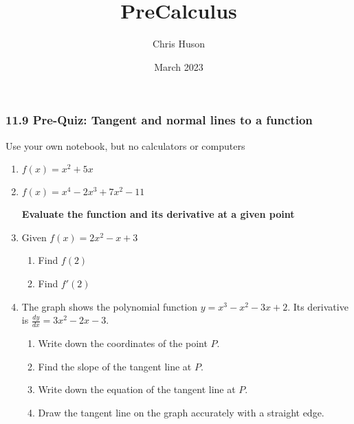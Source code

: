 \documentclass[12pt, twoside]{article}
\title{PreCalculus}
\author{Chris Huson}
\date{March 2023}
\begin{document}
\subsubsection*{11.9 Pre-Quiz: Tangent and normal lines to a function}
Use your own notebook, but no calculators or computers

\begin{enumerate}

\subsubsection*{Find the derivative of each polynomial function}
\item $f(x)=x^2+5x$ \vspace{3cm}
\item $f(x)=x^4-2x^3+7x^2-11$ \par \vspace{3cm}

\textbf{Evaluate the function and its derivative at a given point}
\item Given $f(x)=2x^2-x+3$
\begin{enumerate}[itemsep=3cm]
    \item Find $f(2)$
    \item Find $f'(2)$
\end{enumerate} \vspace{2cm}

\newpage
\item The graph shows the polynomial function $\displaystyle y=x^3-x^2-3x+2$. Its derivative is $\displaystyle \frac{dy}{dx}=3x^2-2x-3$. 
\begin{multicols}{2}
    \begin{enumerate}[itemsep=1cm]
        \item Write down the coordinates of the point $P$.
        \item Find the slope of the tangent line at $P$.
        \item Write down the equation of the tangent line at $P$.
        \item Draw the tangent line on the graph accurately with a straight edge.
    \end{enumerate}
        \begin{center}
    \end{center}
\end{multicols}


\end{enumerate}
\end{document}
